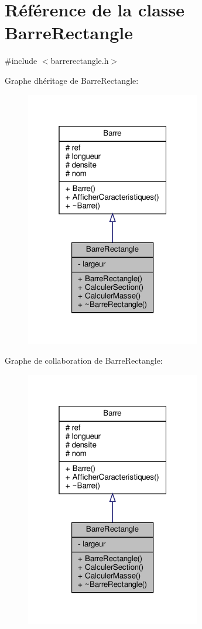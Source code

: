 \hypertarget{class_barre_rectangle}{}\section{Référence de la classe Barre\+Rectangle}
\label{class_barre_rectangle}


{\ttfamily \#include $<$barrerectangle.\+h$>$}



Graphe d\textquotesingle{}héritage de Barre\+Rectangle\+:
\nopagebreak
\begin{figure}[H]
\begin{center}
\leavevmode
\includegraphics[width=217pt]{class_barre_rectangle__inherit__graph}
\end{center}
\end{figure}


Graphe de collaboration de Barre\+Rectangle\+:
\nopagebreak
\begin{figure}[H]
\begin{center}
\leavevmode
\includegraphics[width=217pt]{class_barre_rectangle__coll__graph}
\end{center}
\end{figure}
